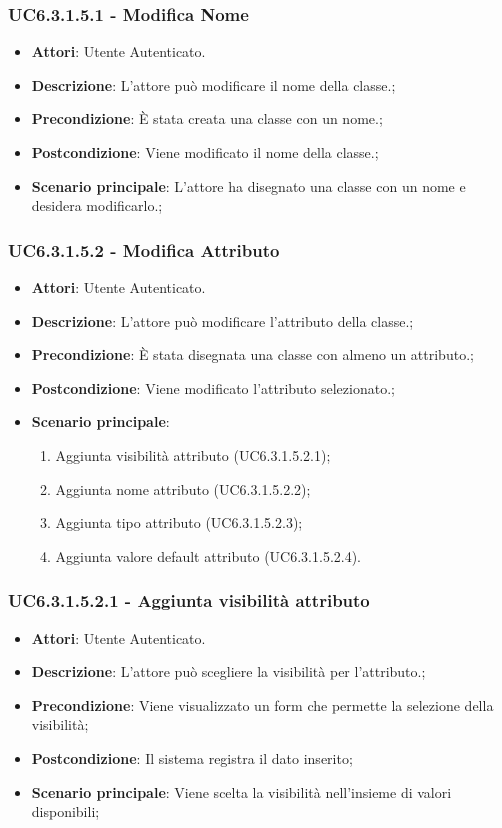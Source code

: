 \subsubsection{UC6.3.1.5.1 - Modifica Nome} 
\label{sssec:UC6.3.1.5.1} 
\begin{itemize} 
\item \textbf{Attori}: Utente Autenticato.
\item \textbf{Descrizione}: L'attore può modificare il nome della classe.;
\item \textbf{Precondizione}: È stata creata una classe con un nome.;
\item \textbf{Postcondizione}: Viene modificato il nome della classe.;
\item \textbf{Scenario principale}: L'attore ha disegnato una classe con un nome e desidera modificarlo.;\end{itemize} 
\subsubsection{UC6.3.1.5.2 - Modifica Attributo} 
\label{sssec:UC6.3.1.5.2} 
\begin{itemize} 
\item \textbf{Attori}: Utente Autenticato.
\item \textbf{Descrizione}: L'attore può modificare l'attributo della classe.;
\item \textbf{Precondizione}: È stata disegnata una classe con almeno un attributo.;
\item \textbf{Postcondizione}: Viene modificato l'attributo selezionato.;
\item \textbf{Scenario principale}: \begin{enumerate}\item Aggiunta visibilità attributo (UC6.3.1.5.2.1);\item Aggiunta nome attributo (UC6.3.1.5.2.2);\item Aggiunta tipo attributo (UC6.3.1.5.2.3);\item Aggiunta valore default attributo (UC6.3.1.5.2.4). 
 \end{enumerate}
\end{itemize} 
\subsubsection{UC6.3.1.5.2.1 - Aggiunta visibilità attributo} 
\label{sssec:UC6.3.1.5.2.1} 
\begin{itemize} 
\item \textbf{Attori}: Utente Autenticato.
\item \textbf{Descrizione}: L'attore può scegliere la visibilità per l'attributo.;
\item \textbf{Precondizione}: Viene visualizzato un form che permette la selezione della visibilità;
\item \textbf{Postcondizione}: Il sistema registra il dato inserito;
\item \textbf{Scenario principale}: Viene scelta la visibilità nell'insieme di valori disponibili;\end{itemize} 

